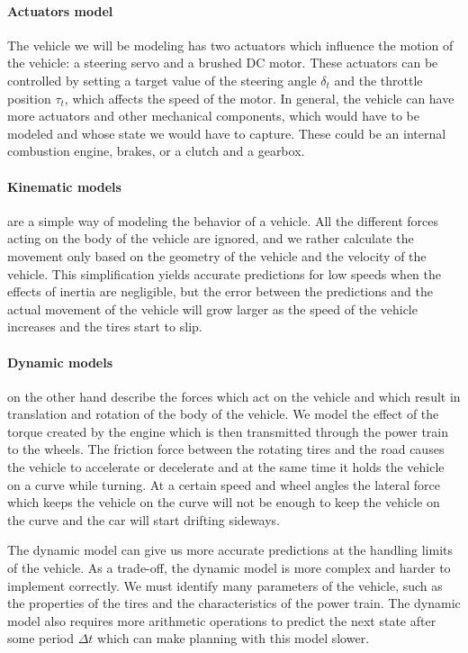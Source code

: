 \paragraph{Actuators model} 
The vehicle we will be modeling has two actuators which influence the motion of the vehicle: a steering servo and a brushed DC motor. These actuators can be controlled by setting a target value of the steering angle $\delta_t$ and the throttle position $\tau_t$, which affects the speed of the motor. In general, the vehicle can have more actuators and other mechanical components, which would have to be modeled and whose state we would have to capture. These could be an internal combustion engine, brakes, or a clutch and a gearbox.

\paragraph{Kinematic models} are a simple way of modeling the behavior of a vehicle. All the different forces acting on the body of the vehicle are ignored, and we rather calculate the movement only based on the geometry of the vehicle and the velocity of the vehicle. This simplification yields accurate predictions for low speeds when the effects of inertia are negligible, but the error between the predictions and the actual movement of the vehicle will grow larger as the speed of the vehicle increases and the tires start to slip.

\paragraph{Dynamic models} on the other hand describe the forces which act on the vehicle and which result in translation and rotation of the body of the vehicle. We model the effect of the torque created by the engine which is then transmitted through the power train to the wheels. The friction force between the rotating tires and the road causes the vehicle to accelerate or decelerate and at the same time it holds the vehicle on a curve while turning. At a certain speed and wheel angles the lateral force which keeps the vehicle on the curve will not be enough to keep the vehicle on the curve and the car will start drifting sideways.

The dynamic model can give us more accurate predictions at the handling limits of the vehicle. As a trade-off, the dynamic model is more complex and harder to implement correctly. We must identify many parameters of the vehicle, such as the properties of the tires and the characteristics of the power train. The dynamic model also requires more arithmetic operations to predict the next state after some period $\Delta t$ which can make planning with this model slower.

